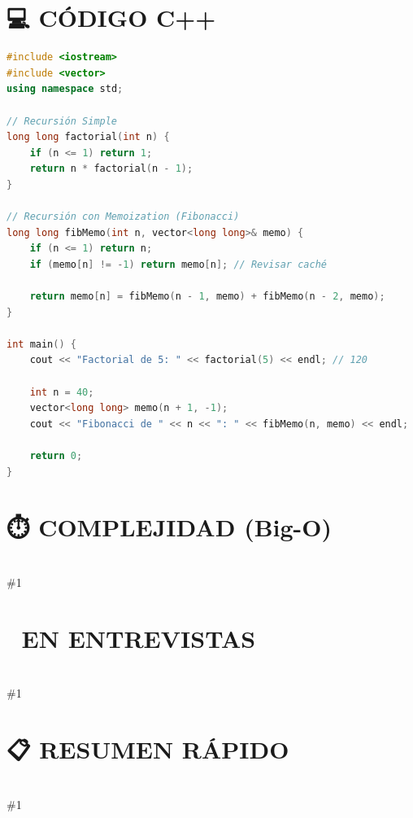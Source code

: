 \documentclass{article}
\newcommand{\complejidad}[1]{\section*{⏱️ COMPLEJIDAD (Big-O)}\hrulefill \\ \#1}
\newcommand{\entrevistas}[1]{\section*{🎯 EN ENTREVISTAS}\hrulefill \\ \#1}
\newcommand{\resumen}[1]{\section*{📋 RESUMEN RÁPIDO}\hrulefill \\ \#1}
\begin{document}
\section*{💻 CÓDIGO C++}
\hrulefill
\begin{lstlisting}[language=C++]
#include <iostream>
#include <vector>
using namespace std;

// Recursión Simple
long long factorial(int n) {
    if (n <= 1) return 1;
    return n * factorial(n - 1);
}

// Recursión con Memoization (Fibonacci)
long long fibMemo(int n, vector<long long>& memo) {
    if (n <= 1) return n;
    if (memo[n] != -1) return memo[n]; // Revisar caché
    
    return memo[n] = fibMemo(n - 1, memo) + fibMemo(n - 2, memo);
}

int main() {
    cout << "Factorial de 5: " << factorial(5) << endl; // 120
    
    int n = 40;
    vector<long long> memo(n + 1, -1);
    cout << "Fibonacci de " << n << ": " << fibMemo(n, memo) << endl;
    
    return 0;
}
\end{lstlisting}
\complejidad{Algoritmo        │ Tiempo (Normal) │ Con Memoization
  ─────────────────┼─────────────────┼────────────────────────
  Factorial        │ O(n)            │ O(n)
  Fibonacci        │ O(2\textasciicircum{}n) 💀       │ O(n) ⚡
  Espacio          │ O(n) (Stack)    │ O(n) (Stack + Cache)}
\entrevistas{}
\resumen{• Función que se llama a sí misma.
• Requiere Caso Base y Caso Recursivo.
• Úsala para árboles, grafos y problemas de "Divide y Vencerás".
• Memoization: El truco para que la recursión sea ultra rápida.
• Cuidado con el Stack Overflow en inputs grandes.
• Cada nivel de recursión = O(1) de espacio extra en el stack.
════════════════════════════════════════════════════════════════}
\end{document}
